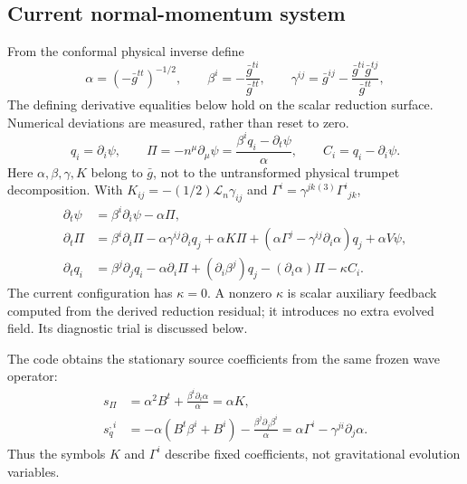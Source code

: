 \documentclass[11pt,letterpaper]{article}
\newcommand{\G}{\bar g}
\begin{document}
\subsection{Current normal-momentum system}
From the conformal physical inverse define
\begin{equation}
 \alpha=(-\G^{tt})^{-1/2},\qquad \beta^i=-\frac{\G^{ti}}{\G^{tt}},\qquad
 \gamma^{ij}=\G^{ij}-\frac{\G^{ti}\G^{tj}}{\G^{tt}},
\end{equation}
The defining derivative equalities below hold on the scalar reduction surface. Numerical deviations are measured, rather than reset to zero.
\begin{equation}
 q_i=\partial_i\psi,\qquad \Pi=-n^\mu\partial_\mu\psi
 =\frac{\beta^iq_i-\partial_t\psi}{\alpha},\qquad C_i=q_i-\partial_i\psi.
\end{equation}
Here $\alpha,\beta,\gamma,K$ belong to $\G$, not to the untransformed physical trumpet decomposition. With $K_{ij}=-(1/2)\mathcal L_n\gamma_{ij}$ and $\Gamma^i=\gamma^{jk}{}^{(3)}\Gamma^i{}_{jk}$,
\begin{align}\label{eq:normal}
 \partial_t\psi&=\beta^i\partial_i\psi-\alpha\Pi,\\
 \partial_t\Pi&=\beta^i\partial_i\Pi-\alpha\gamma^{ij}\partial_iq_j
 +\alpha K\Pi+(\alpha\Gamma^j-\gamma^{ij}\partial_i\alpha)q_j+\alpha V\psi,\\
 \partial_tq_i&=\beta^j\partial_jq_i-\alpha\partial_i\Pi
 +(\partial_i\beta^j)q_j-(\partial_i\alpha)\Pi-\kappa C_i.
\end{align}
The current configuration has $\kappa=0$. A nonzero $\kappa$ is scalar auxiliary feedback computed from the derived reduction residual; it introduces no extra evolved field. Its diagnostic trial is discussed below.

The code obtains the stationary source coefficients from the same frozen wave operator:
\begin{align}
 s_\Pi&=\alpha^2B^t+\frac{\beta^i\partial_i\alpha}{\alpha}=\alpha K,\\
 s_q^{,i}&=-\alpha(B^t\beta^i+B^i)
 -\frac{\beta^j\partial_j\beta^i}{\alpha}
 =\alpha\Gamma^i-\gamma^{ji}\partial_j\alpha.
\end{align}
Thus the symbols $K$ and $\Gamma^i$ describe fixed coefficients, not gravitational evolution variables.
\end{document}
